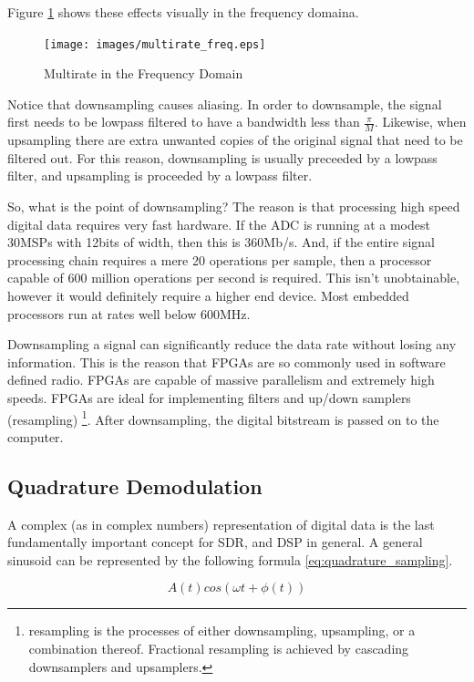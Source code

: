 \documentclass[a4paper, 12pt, notitlepage]{article}
\begin{document}
Figure \ref{fig:multirate_freq} shows these effects visually in the frequency domaina.

\begin{figure}[ht]
\caption{Multirate in the Frequency Domain}
\label{fig:multirate_freq}
\centering
\texttt{[image: images/multirate\_freq.eps]}
\end{figure}

Notice that downsampling causes aliasing.  In order to downsample, the signal first needs to be lowpass filtered to have a bandwidth less than $\frac{\pi}{M}$.  Likewise, when upsampling there are extra unwanted copies of the original signal that need to be filtered out.  For this reason, downsampling is usually preceeded by a lowpass filter, and upsampling is proceeded by a lowpass filter.

So, what is the point of downsampling?  The reason is that processing high speed digital data requires very fast hardware.  If the ADC is running at a modest 30MSPs with 12bits of width, then this is 360Mb/s.  And, if the entire signal processing chain requires a mere 20 operations per sample, then a processor capable of 600 million operations per second is required.  This isn't unobtainable, however it would definitely require a higher end device.  Most embedded processors run at rates well below 600MHz.  

Downsampling a signal can significantly reduce the data rate without losing any information.  This is the reason that FPGAs are so commonly used in software defined radio.  FPGAs are capable of massive parallelism and extremely high speeds.  FPGAs are ideal for implementing filters and up/down samplers (resampling) \footnote{resampling is the processes of either downsampling, upsampling, or a combination thereof.  Fractional resampling is achieved by cascading downsamplers and upsamplers.}.  After downsampling, the digital bitstream is passed on to the computer.

\subsection{Quadrature Demodulation}
\label{sec:quadrature_sampling}
A complex (as in complex numbers) representation of digital data is the last fundamentally important concept for SDR, and DSP in general.  A general sinusoid can be represented by the following formula \ref{eq:quadrature_sampling}.

\begin{equation}
\label{eq:quadrature_sampling}
A(t)cos(\omega t + \phi (t))
\end{equation}
\end{document}
